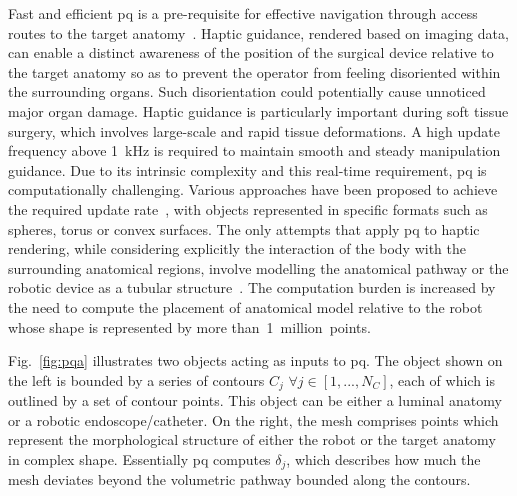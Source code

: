 Fast and efficient \gls{pq} is a pre-requisite for effective navigation through access routes to the target anatomy~\cite{kwok10}.
Haptic guidance, rendered based on imaging data, can enable a distinct awareness of the position of the surgical device relative to the target anatomy so as to prevent the operator from feeling disoriented within the surrounding organs. 
Such disorientation could potentially cause unnoticed major organ damage. 
Haptic guidance is particularly important during soft tissue surgery, which involves large-scale and rapid tissue deformations. 
A high update frequency above 1~kHz is required to maintain smooth and steady manipulation guidance. 
Due to its intrinsic complexity and this real-time requirement, \gls{pq} is computationally challenging.
Various approaches have been proposed to achieve the required update rate~\cite{benallegue09,chakraborty08}, 
with objects represented in specific formats such as spheres, torus or convex surfaces.
The only attempts that apply \gls{pq} to haptic rendering, while considering explicitly the interaction of the body with the surrounding anatomical regions, involve modelling the anatomical pathway or the robotic device as a tubular structure~\cite{li07,kwok13}.
The computation burden is increased by the need to compute the placement of anatomical model relative to the robot whose shape is represented by more than~1~million~points.

Fig.~\ref{fig:pqa} illustrates two objects acting as inputs to \gls{pq}. 
The object shown on the left is bounded by a series of contours $C_j$ $\forall j \in [1,...,N_C]$, each of which is outlined by a set of contour points. 
This object can be either a luminal anatomy or a robotic endoscope/catheter. 
On the right, the mesh comprises points which represent the morphological structure of either the robot or the target anatomy in complex shape. 
Essentially \gls{pq} computes $\delta_j$, which describes how much the mesh deviates beyond the volumetric pathway bounded along the contours.

